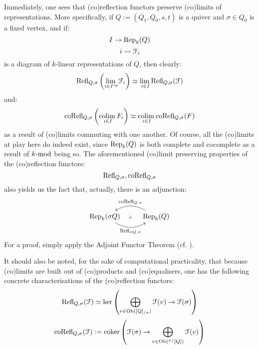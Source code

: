             \begin{remark} \label{remark: categorical_properties_of_(co)reflection_functors}
                Immediately, one sees that (co)reflection functors preserve (co)limits of representations. More specifically, if $Q := (Q_1, Q_0, s, t)$ is a quiver and $\sigma \in Q_0$ is a fixed vertex, and if:
                    $$I \to \Rep_k(Q)$$
                    $$i \mapsto \calF_i$$
                is a diagram of $k$-linear representations of $Q$, then clearly:
                    $$\Refl_{Q, \sigma}\left( \underset{i \in I^{\op}}{\lim} \calF_i \right) \cong \underset{i \in I}{\lim} \Refl_{Q, \sigma}(\calF)$$
                and:
                    $$\co\Refl_{Q, \sigma}\left( \underset{i \in I}{\colim} F_i \right) \cong \underset{i \in I}{\colim} \co\Refl_{Q, \sigma}(F)$$
                as a result of (co)limits commuting with one another. Of course, all the (co)limits at play here do indeed exist, since $\Rep_k(Q)$ is both complete and cocomplete as a result of $k\mod$ being so. The aforementioned (co)limit preserving properties of the (co)reflection functors:
                    $$\Refl_{Q, \sigma}, \co\Refl_{Q, \sigma}$$
                also yields us the fact that, actually, there is an adjunction:
                    $$
                        \begin{tikzcd}
                        	{\Rep_k(\sigma Q)} & {\Rep_k(Q)}
                        	\arrow[""{name=0, anchor=center, inner sep=0}, "{\Refl_{\sigma Q, \sigma}}"', bend right, from=1-1, to=1-2]
                        	\arrow[""{name=1, anchor=center, inner sep=0}, "{\co\Refl_{Q, \sigma}}"', bend right, from=1-2, to=1-1]
                        	\arrow["\dashv"{anchor=center, rotate=-90}, draw=none, from=1, to=0]
                        \end{tikzcd}
                    $$
                For a proof, simply apply the Adjoint Functor Theorem (cf. \cite{nlab:adjoint_functor_theorem}).
                
                It should also be noted, for the sake of computational practicality, that because (co)limits are built out of (co)products and (co)equalisers, one has the following concrete characterisations of the (co)reflection functors:
                    $$\Refl_{Q, \sigma}(\calF) \cong \ker\left(\bigoplus_{v \in \Ob([Q]_{/\sigma})} \calF(v) \to \calF(\sigma)\right)$$
                    $$\co\Refl_{Q, \sigma}(\calF) := \coker\left(\calF(\sigma) \to \bigoplus_{v \in \Ob({}^{\sigma/}[Q])} \calF(v)\right)$$
            \end{remark}
            
